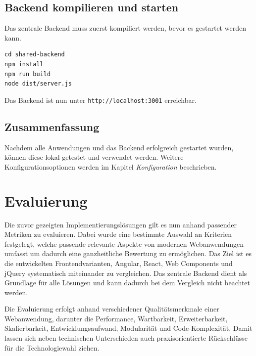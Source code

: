 \documentclass[oneside]{ausarbeitung}
\begin{document}
\section{Backend kompilieren und starten}
Das zentrale Backend muss zuerst kompiliert werden, bevor es gestartet werden kann.

\begin{verbatim}
cd shared-backend
npm install
npm run build
node dist/server.js
\end{verbatim}

Das Backend ist nun unter \texttt{http://localhost:3001} erreichbar.

\section{Zusammenfassung}
Nachdem alle Anwendungen und das Backend erfolgreich gestartet wurden, können diese lokal getestet und verwendet werden. Weitere Konfigurationsoptionen werden im Kapitel \textit{Konfiguration} beschrieben.

\chapter{Evaluierung}

Die zuvor gezeigten Implementierungslösungen gilt es nun anhand passender Metriken zu evaluieren. Dabei wurde eine bestimmte Auswahl an Kriterien festgelegt, welche passende relevante Aspekte von modernen Webanwendungen umfasst um dadurch eine ganzheitliche Bewertung zu ermöglichen. Das Ziel ist es die entwickelten Frontendvarianten, Angular, React, Web Components und jQuery systematisch miteinander zu vergleichen. Das zentrale Backend dient als Grundlage für alle Lösungen und kann dadurch bei dem Vergleich nicht beachtet werden. 

Die Evaluierung erfolgt anhand verschiedener Qualitätsmerkmale einer Webanwendung, darunter die Performance, Wartbarkeit, Erweiterbarkeit, Skalierbarkeit, Entwicklungsaufwand, Modularität und Code-Komplexität. Damit lassen sich neben technischen Unterschieden auch praxisorientierte Rückschlüsse für die Technologiewahl ziehen. 
\end{document}

